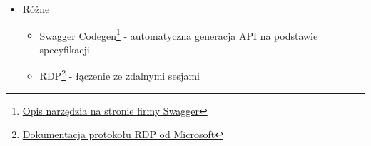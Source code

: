 \documentclass[../deliverable-two.tex]{subfiles}
\begin{document}
\begin{itemize}
\begin{itemize}
              \item libvirt\footnote{\href{https://libvirt.org/}{Strona projektu libvirt}} - zarządzanie maszynami wirtualnymi
              \item OpenLDAP\footnote{\href{https://www.openldap.org/}{Strona projektu OpenLDAP}} - dostępu do systemu katalogowego
              \item NFS\footnote{\href{https://docs.microsoft.com/en-us/windows-server/storage/nfs/nfs-overview}{Opis na stronie firmy Microsoft}} - dostęp do katalogów domowych z maszyny wirtualnej
              \item Arch Linux\footnote{\href{https://archlinux.org/}{Strona systemu operacyjnego Arch Linux}} - system operacyjny uruchamiany przez maszyny wirtualne
              \item GNU/Linux - wspierany system operacyjny
          \end{itemize}
    \item Różne
          \begin{itemize}
              \item Swagger Codegen\footnote{\href{https://swagger.io/tools/swagger-codegen/}{Opis narzędzia na stronie firmy Swagger}} - automatyczna generacja API na podstawie specyfikacji
              \item RDP\footnote{\href{https://docs.microsoft.com/en-us/troubleshoot/windows-server/remote/understanding-remote-desktop-protocol}{Dokumentacja protokołu RDP od Microsoft}} - łączenie ze zdalnymi sesjami
          \end{itemize}
\end{itemize}
\end{document}
